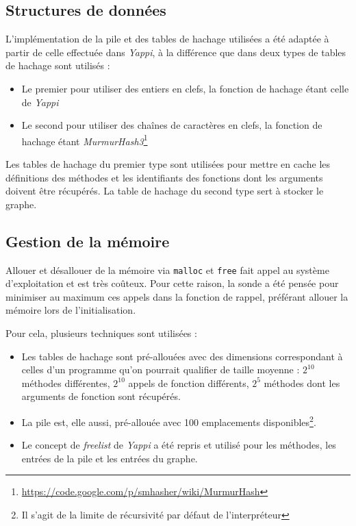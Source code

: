 \subsection{Structures de données}
L'implémentation de la pile et des tables de hachage utilisées a été adaptée à partir de celle effectuée dans \emph{Yappi}, à la différence que dans \Blackfire deux types de tables de hachage sont utilisés :
\begin{itemize}
\item Le premier pour utiliser des entiers en clefs, la fonction de hachage étant celle de \emph{Yappi}
\item Le second pour utiliser des chaînes de caractères en clefs, la fonction de hachage étant \emph{MurmurHash3}\footnote{\url{https://code.google.com/p/smhasher/wiki/MurmurHash}}
\end{itemize}

Les tables de hachage du premier type sont utilisées pour mettre en cache les définitions des méthodes et les identifiants des fonctions dont les arguments doivent être récupérés. La table de hachage du second type sert à stocker le graphe.

\subsection{Gestion de la mémoire}
Allouer et désallouer de la mémoire via \verb|malloc| et \verb|free| fait appel au système d'exploitation et est très coûteux. Pour cette raison, la sonde \Python a été pensée pour minimiser au maximum ces appels dans la fonction de rappel, préférant allouer la mémoire lors de l'initialisation.

Pour cela, plusieurs techniques sont utilisées :
\begin{itemize}
\item Les tables de hachage sont pré-allouées avec des dimensions correspondant à celles d'un programme qu'on pourrait qualifier de taille moyenne : $2^{10}$ méthodes différentes, $2^{10}$ appels de fonction différents, $2^5$ méthodes dont les arguments de fonction sont récupérés.
\item La pile est, elle aussi, pré-allouée avec 100 emplacements disponibles\footnote{Il s'agit de la limite de récursivité par défaut de l'interpréteur \Python}.
\item Le concept de \emph{freelist} de \emph{Yappi} a été repris et utilisé pour les méthodes, les entrées de la pile et les entrées du graphe.
\end{itemize}

